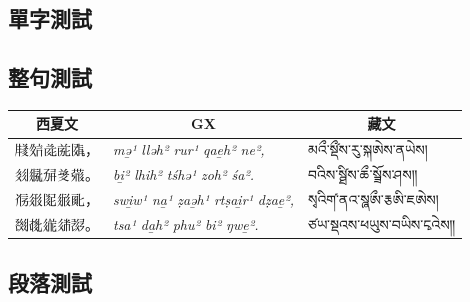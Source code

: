 \documentclass[12pt]{nextart_zh}
\begin{document}
\subsection{單字測試}
\begin{center}
\small
\renewcommand{\arraystretch}{1.15}
\setlength{\tabcolsep}{6pt}
\end{center}

\subsection{整句測試}

\begin{center}
\small
\renewcommand{\arraystretch}{1.20}
\setlength{\tabcolsep}{6pt}
\begin{tabular}{lll}
\toprule
\multicolumn{1}{c}{\textbf{西夏文}} &
\multicolumn{1}{c}{\textbf{GX}} &
\multicolumn{1}{c}{\textbf{藏文}} \\
\midrule
𗹦𗼻𗯨𗐯𗂥， &
\emph{mə̱¹ lləh² rur¹ qae̱h² ne²,} &
མའྀ་སྡྀ༹ས་རུ་སྐཨེས་ནཡེས། \\

𗾔𗼑𗉘𘝨𗜓。 &
\emph{bi̱² lhih² tśhə¹ zoh² śa².} &
བའིས་སྠི༹ས་ཆྀ་སྯོས་ཤས༎ \\

𗭼𗤼𗂈𗼛𘚢， &
\emph{swi̱w¹ na̱¹ ẓaə̱h¹ rtṣai̱r¹ dẓae̱²,} &
སྭའིག༹་ནའ་སྮཨྀ་རྕཨི་ཇཨེས། \\

𗉅𗎒𗨁𗤢𗖠。 &
\emph{tsa¹ da̱h² phu² bi² ŋwe̱².} &
ཙཡ་སྡའས་ཕཡུས་བཡིས་ངྭའེས༎ \\
\bottomrule
\end{tabular}
\end{center}

\subsection{段落測試}
\end{document}

